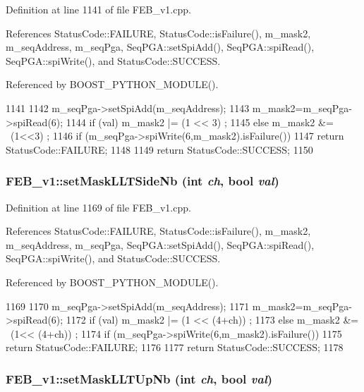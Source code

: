 Definition at line 1141 of file FEB\_\-v1.cpp.

References StatusCode::FAILURE, StatusCode::isFailure(), m\_\-mask2, m\_\-seqAddress, m\_\-seqPga, SeqPGA::setSpiAdd(), SeqPGA::spiRead(), SeqPGA::spiWrite(), and StatusCode::SUCCESS.

Referenced by BOOST\_\-PYTHON\_\-MODULE().


\begin{DoxyCode}
1141                                            {
1142   m_seqPga->setSpiAdd(m_seqAddress);
1143   m_mask2=m_seqPga->spiRead(6);
1144   if (val)  m_mask2 |= (1 << 3)  ;
1145   else      m_mask2 &= ~(1<<3) ;
1146   if (m_seqPga->spiWrite(6,m_mask2).isFailure()){
1147     return StatusCode::FAILURE;
1148   }
1149   return StatusCode::SUCCESS;  
1150 }
\end{DoxyCode}
\hypertarget{classFEB__v1_a519a955361c420680af64c7fa9410784}{
\subsubsection[{setMaskLLTSideNb}]{ FEB\_\-v1::setMaskLLTSideNb (int {\em ch}, \/  bool {\em val})}}
\label{classFEB__v1_a519a955361c420680af64c7fa9410784}


Definition at line 1169 of file FEB\_\-v1.cpp.

References StatusCode::FAILURE, StatusCode::isFailure(), m\_\-mask2, m\_\-seqAddress, m\_\-seqPga, SeqPGA::setSpiAdd(), SeqPGA::spiRead(), SeqPGA::spiWrite(), and StatusCode::SUCCESS.

Referenced by BOOST\_\-PYTHON\_\-MODULE().


\begin{DoxyCode}
1169                                                    {
1170   m_seqPga->setSpiAdd(m_seqAddress);
1171   m_mask2=m_seqPga->spiRead(6);
1172   if (val)  m_mask2 |= (1 << (4+ch))  ;
1173   else      m_mask2 &= ~(1<< (4+ch)) ;
1174   if (m_seqPga->spiWrite(6,m_mask2).isFailure()){
1175     return StatusCode::FAILURE;
1176   }
1177   return StatusCode::SUCCESS;
1178 }
\end{DoxyCode}
\hypertarget{classFEB__v1_a904bff89e5ad45ce78730502dc26a0e3}{
\subsubsection[{setMaskLLTUpNb}]{ FEB\_\-v1::setMaskLLTUpNb (int {\em ch}, \/  bool {\em val})}}
\label{classFEB__v1_a904bff89e5ad45ce78730502dc26a0e3}


